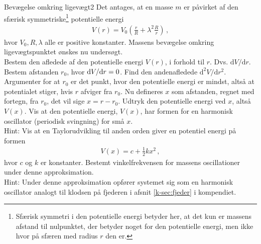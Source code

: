 \begin{opgave}{Bevægelse omkring ligevægt}{2}\label{mek:opg:equilibrium}
Det antages, at en masse $m$ er påvirket af den sfærisk symmetriske\footnote{Sfærisk symmetri i den potentielle energi betyder her, at det kun er massens afstand til nulpunktet, der betyder noget for den potentielle energi, men ikke hvor på sfæren med radius $r$ den er.} potentielle energi
\begin{align*}
V(r) = V_0\left(\frac{r}{R} + \lambda^2\frac{R}{r}\right) \, ,
\end{align*}
hvor $V_0,R,\lambda$ alle er positive konstanter.	Massens bevægelse omkring ligevægtspunktet ønskes nu undersøgt. \\
\opg Bestem den afledede af den potentielle energi $V(r)$, i forhold til $r$. Dvs. $\text{d}V / \text{d} r$.
\opg Bestem afstanden $r_0$, hvor $\mathrm{d} V/\mathrm{d} r = 0$.
\opg Find den andenafledede $\text{d}^2 V / \text{d} r^2$.
\opg Argumenter for at $r_0$ er det punkt, hvor den potentielle energi er mindst, altså at potentialet stiger, hvis $r$ afviger fra $r_0$.
\opg Nu defineres $x$ som afstanden, regnet med fortegn, fra $r_0$, det vil sige $x = r - r_0$. Udtryk den potentielle energi ved $x$, altså $V(x)$.
\opg Vis at den potentielle energi, $V(x)$, har formen for en harmonisk oscillator (periodisk svingning) for små $x$. \\
Hint: Vis at en Taylorudvikling til anden orden giver en potentiel energi på formen
\begin{align*}
	V(x) = c + \frac{1}{2}kx^2 \, ,
\end{align*}
hvor $c$ og $k$ er konstanter. 
\opg Bestemt vinkelfrekvensen for massens oscillationer under denne approksimation. \\
Hint: Under denne approksimation opfører systemet sig som en harmonisk oscillator analogt til klodsen på fjederen i afsnit \ref{k-sec:fjeder} i kompendiet.
\end{opgave}
%
%
